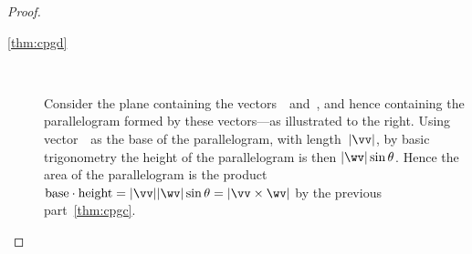 \begin{proof}
\begin{description}
\item[\ref{thm:cpgd}] \ \\
\begin{figbox}{}%
Consider the plane containing the vectors~\vv\ and~\wv, 
and hence containing the parallelogram formed by these vectors---as illustrated to the right.
Using vector~\vv\ as the base of the parallelogram, with length~\(|\vv|\), by basic trigonometry the height of the parallelogram is then \(|\wv|\sin\theta\).
Hence the area of the parallelogram is the product 
\(\text{base}\cdot\text{height}=|\vv||\wv|\sin\theta=|\vv\times\wv|\) by the previous part~\ref{thm:cpgc}.\end{figbox}
\end{description}
\end{proof}

